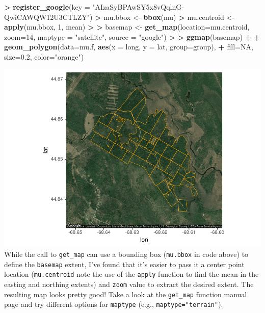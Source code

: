 \documentclass[
]{krantz}
\makeatletter
\newenvironment{Shaded}{\begin{snugshade}}{\end{snugshade}}
\newcommand{\DataTypeTok}[1]{\textcolor[rgb]{0.27,0.27,0.27}{#1}}
\newcommand{\DecValTok}[1]{\textcolor[rgb]{0.06,0.06,0.06}{#1}}
\newcommand{\ErrorTok}[1]{\textcolor[rgb]{0.14,0.14,0.14}{\textbf{#1}}}
\newcommand{\FloatTok}[1]{\textcolor[rgb]{0.06,0.06,0.06}{#1}}
\newcommand{\KeywordTok}[1]{\textcolor[rgb]{0.27,0.27,0.27}{\textbf{#1}}}
\newcommand{\NormalTok}[1]{#1}
\newcommand{\OperatorTok}[1]{\textcolor[rgb]{0.43,0.43,0.43}{\textbf{#1}}}
\newcommand{\OtherTok}[1]{\textcolor[rgb]{0.37,0.37,0.37}{#1}}
\newcommand{\StringTok}[1]{\textcolor[rgb]{0.5,0.5,0.5}{#1}}
\newenvironment{kframe}{%
\medskip{}
\setlength{\fboxsep}{.8em}
 \def\at@end@of@kframe{}%
 \ifinner\ifhmode%
  \def\at@end@of@kframe{\end{minipage}}%
  \begin{minipage}{\columnwidth}%
 \fi\fi%
 \def\FrameCommand##1{\hskip\@totalleftmargin \hskip-\fboxsep
 \colorbox{shadecolor}{##1}\hskip-\fboxsep
     \hskip-\linewidth \hskip-\@totalleftmargin \hskip\columnwidth}%
 \MakeFramed {\advance\hsize-\width
   \@totalleftmargin\z@ \linewidth\hsize
   \@setminipage}}%
 {\par\unskip\endMakeFramed%
 \at@end@of@kframe}
\renewenvironment{Shaded}{\begin{kframe}}{\end{kframe}}
\makeatother
\begin{document}
\begin{Shaded}
\begin{Highlighting}[]
\OperatorTok{\textgreater{}}\StringTok{ }\KeywordTok{register\_google}\NormalTok{(}\DataTypeTok{key =} \StringTok{"AIzaSyBPAwSY5x8vQqlnG{-}QwiCAWQW12U3CTLZY"}\NormalTok{)}
\OperatorTok{\textgreater{}}\StringTok{ }\NormalTok{mu.bbox \textless{}{-}}\StringTok{ }\KeywordTok{bbox}\NormalTok{(mu)}
\OperatorTok{\textgreater{}}\StringTok{ }\NormalTok{mu.centroid \textless{}{-}}\StringTok{ }\KeywordTok{apply}\NormalTok{(mu.bbox, }\DecValTok{1}\NormalTok{, mean)}
\OperatorTok{\textgreater{}}\StringTok{ }
\ErrorTok{\textgreater{}}\StringTok{ }\NormalTok{basemap \textless{}{-}}\StringTok{ }\KeywordTok{get\_map}\NormalTok{(}\DataTypeTok{location=}\NormalTok{mu.centroid, }\DataTypeTok{zoom=}\DecValTok{14}\NormalTok{, }\DataTypeTok{maptype =} \StringTok{"satellite"}\NormalTok{, }\DataTypeTok{source =} \StringTok{"google"}\NormalTok{)}
\OperatorTok{\textgreater{}}\StringTok{                                     }
\ErrorTok{\textgreater{}}\StringTok{ }\KeywordTok{ggmap}\NormalTok{(basemap) }\OperatorTok{+}\StringTok{ }
\OperatorTok{+}\StringTok{   }\KeywordTok{geom\_polygon}\NormalTok{(}\DataTypeTok{data=}\NormalTok{mu.f, }\KeywordTok{aes}\NormalTok{(}\DataTypeTok{x =}\NormalTok{ long, }\DataTypeTok{y =}\NormalTok{ lat, }\DataTypeTok{group=}\NormalTok{group), }
\OperatorTok{+}\StringTok{                  }\DataTypeTok{fill=}\OtherTok{NA}\NormalTok{, }\DataTypeTok{size=}\FloatTok{0.2}\NormalTok{, }\DataTypeTok{color=}\StringTok{"orange"}\NormalTok{)}
\end{Highlighting}
\end{Shaded}

\includegraphics{bookdown_files/figure-latex/unnamed-chunk-200-1.pdf}
While the call to \texttt{get\_map} can use a bounding box (\texttt{mu.bbox} in code above) to define the \texttt{basemap} extent, I've found that it's easier to pass it a center point location (\texttt{mu.centroid} note the use of the \texttt{apply} function to find the mean in the easting and northing extents) and \texttt{zoom} value to extract the desired extent. The resulting map looks pretty good! Take a look at the \texttt{get\_map} function manual page and try different options for \texttt{maptype} (e.g., \texttt{maptype="terrain"}).
\end{document}
